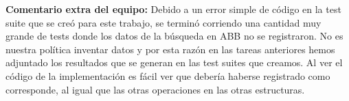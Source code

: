 \documentclass[11pt,letterpaper]{article}
\begin{document}
\textbf{Comentario extra del equipo:} Debido a un error simple de código en la test suite que se creó para este trabajo, se terminó corriendo una cantidad muy grande de tests donde los datos de la búsqueda en ABB no se registraron. No es nuestra política inventar datos y por esta razón en las tareas anteriores hemos adjuntado los resultados que se generan en las test suites que creamos. Al ver el código de la implementación es fácil ver que debería haberse registrado como corresponde, al igual que las otras operaciones en las otras estructuras.

\end{document}
